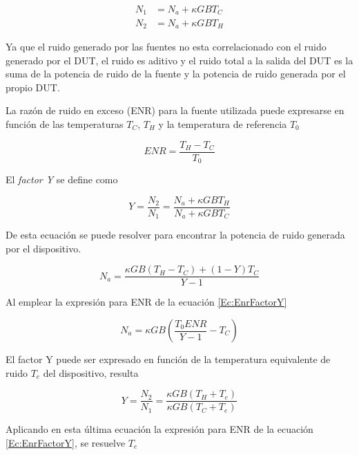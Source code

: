 \documentclass{article}
\begin{document}
	\begin{equation}
		\begin{align}
			N_1 &= N_a+{\kappa}GBT_C \\
			N_2 &= N_a+{\kappa}GBT_H 
		\end{align}		
	\end{equation}
	
	Ya que el ruido generado por las fuentes no esta correlacionado con el ruido generado por el DUT, el ruido es aditivo y el ruido total a la salida del DUT es la suma de la potencia de ruido de la fuente y la potencia de ruido generada por el propio DUT.
		
	La razón de ruido en exceso (ENR) para la fuente utilizada puede expresarse en función de las temperaturas $T_C$, $T_H$ y la temperatura de referencia $T_0$
	
	\begin{equation}
		ENR = \frac{T_H - T_C}{T_0}
		\label{Ec:EnrFactorY}
	\end{equation}
	
	El \emph{factor Y} se define como	
	
	\begin{equation} 
		Y = \frac{N_2}{N_1} = \frac{N_a+{\kappa}GBT_H}{N_a+{\kappa}GBT_C}
	\end{equation}
	
	De esta ecuación se puede resolver para encontrar la potencia de ruido generada por el dispositivo.
	
	\begin{equation}
		N_a = \frac{{\kappa}GB(T_H - T_C) + (1 - Y)T_C}{Y - 1}
		\label{Ec:PotenciaRuido1}
	\end{equation}
	
	Al emplear la expresión para ENR de la ecuación \eqref{Ec:EnrFactorY}
	
	\begin{equation} 
		N_a = {\kappa}GB\left(\frac{T_0ENR}{Y - 1}-T_C\right)
		\label{Ec:PotenciaRuido2}
	\end{equation}
	
	El factor Y puede ser expresado en función de la temperatura equivalente de ruido $T_e$ del dispositivo, resulta
	
	\begin{equation} 
		Y = \frac{N_2}{N_1} = \frac{{\kappa}GB(T_H + T_e)}{{\kappa}GB(T_C + T_e)}		
	\end{equation}	
	
	Aplicando en esta última ecuación la expresión para ENR de la ecuación \eqref{Ec:EnrFactorY}, se resuelve $T_e$
	
\end{document}
